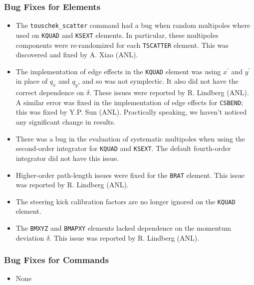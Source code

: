 \documentclass[11pt]{article}
\begin{document}
\subsubsection{Bug Fixes for Elements}

\begin{itemize}
\item The \verb|touschek_scatter| command had a bug when random multipoles where used on \verb|KQUAD| and \verb|KSEXT| elements. In particular,
  these multipoles components were re-randomized for each \verb|TSCATTER| element. This was discovered and fixed by A. Xiao (ANL).
\item The implementation of edge effects in the \verb|KQUAD| element was using $x^\prime$ and $y^\prime$ in place of $q_x$ and $q_y$, and so
  was not symplectic. It also did not have the correct dependence on $\delta$. 
  These issues were reported by R. Lindberg (ANL).  A similar error was fixed in the implementation of edge effects for \verb|CSBEND|;
  this was fixed by Y.P. Sun (ANL). Practically speaking, we haven't noticed any significant change in results.
\item There was a bug in the evaluation of systematic multipoles when using the second-order integrator for \verb|KQUAD| and \verb|KSEXT|.
  The default fourth-order integrator did not have this issue.
\item Higher-order path-length issues were fixed for the \verb|BRAT| element. This issue was reported by R. Lindberg (ANL).
\item The steering kick calibration factors are no longer ignored on the \verb|KQUAD| element.
\item The \verb|BMXYZ| and \verb|BMAPXY| elements lacked dependence on the momentum deviation $\delta$. This issue was reported by R. Lindberg (ANL).
\end{itemize}

\subsubsection{Bug Fixes for Commands}
\begin{itemize}
\item None
\end{itemize}
\end{document}
